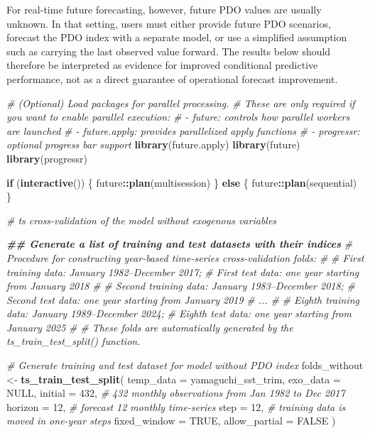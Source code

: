 \documentclass[
]{article}
\newenvironment{Shaded}{\begin{snugshade}}{\end{snugshade}}
\newcommand{\AttributeTok}[1]{\textcolor[rgb]{0.13,0.29,0.53}{#1}}
\newcommand{\CommentTok}[1]{\textcolor[rgb]{0.56,0.35,0.01}{\textit{#1}}}
\newcommand{\ConstantTok}[1]{\textcolor[rgb]{0.56,0.35,0.01}{#1}}
\newcommand{\ControlFlowTok}[1]{\textcolor[rgb]{0.13,0.29,0.53}{\textbf{#1}}}
\newcommand{\DecValTok}[1]{\textcolor[rgb]{0.00,0.00,0.81}{#1}}
\newcommand{\DocumentationTok}[1]{\textcolor[rgb]{0.56,0.35,0.01}{\textbf{\textit{#1}}}}
\newcommand{\FunctionTok}[1]{\textcolor[rgb]{0.13,0.29,0.53}{\textbf{#1}}}
\newcommand{\NormalTok}[1]{#1}
\newcommand{\OtherTok}[1]{\textcolor[rgb]{0.56,0.35,0.01}{#1}}
\newcommand{\SpecialCharTok}[1]{\textcolor[rgb]{0.81,0.36,0.00}{\textbf{#1}}}
\begin{document}
For real-time future forecasting, however, future PDO values are usually
unknown. In that setting, users must either provide future PDO
scenarios, forecast the PDO index with a separate model, or use a
simplified assumption such as carrying the last observed value forward.
The results below should therefore be interpreted as evidence for
improved conditional predictive performance, not as a direct guarantee
of operational forecast improvement.

\begin{Shaded}
\begin{Highlighting}[]
\CommentTok{\# (Optional) Load packages for parallel processing.}
\CommentTok{\# These are only required if you want to enable parallel execution:}
\CommentTok{\# {-} future: controls how parallel workers are launched}
\CommentTok{\# {-} future.apply: provides parallelized apply functions}
\CommentTok{\# {-} progressr: optional progress bar support}
\FunctionTok{library}\NormalTok{(future.apply)}
\FunctionTok{library}\NormalTok{(future)}
\FunctionTok{library}\NormalTok{(progressr)}

\ControlFlowTok{if}\NormalTok{ (}\FunctionTok{interactive}\NormalTok{()) \{}
\NormalTok{  future}\SpecialCharTok{::}\FunctionTok{plan}\NormalTok{(multisession)}
\NormalTok{\} }\ControlFlowTok{else}\NormalTok{ \{}
\NormalTok{  future}\SpecialCharTok{::}\FunctionTok{plan}\NormalTok{(sequential)}
\NormalTok{\}}


\CommentTok{\# ts cross{-}validation of the model without exogenous variables}

\DocumentationTok{\#\# Generate a list of training and test datasets with their indices}
\CommentTok{\# Procedure for constructing year{-}based time{-}series cross{-}validation folds:}
\CommentTok{\# }
\CommentTok{\# First training data: January 1982–December 2017;}
\CommentTok{\# First test data: one year starting from January 2018}
\CommentTok{\# }
\CommentTok{\# Second training data: January 1983–December 2018;}
\CommentTok{\# Second test data: one year starting from January 2019}
\CommentTok{\# ...}
\CommentTok{\# }
\CommentTok{\# Eighth training data: January 1989–December 2024;}
\CommentTok{\# Eighth test data: one year starting from January 2025}
\CommentTok{\#}
\CommentTok{\# These folds are automatically generated by the ts\_train\_test\_split() function.}

\CommentTok{\# Generate training and test dataset for model without PDO index}
\NormalTok{folds\_without }\OtherTok{\textless{}{-}} \FunctionTok{ts\_train\_test\_split}\NormalTok{(}
  \AttributeTok{temp\_data =}\NormalTok{ yamaguchi\_sst\_trim,}
  \AttributeTok{exo\_data =} \ConstantTok{NULL}\NormalTok{,}
  \AttributeTok{initial =} \DecValTok{432}\NormalTok{, }\CommentTok{\# 432 monthly observations from Jan 1982 to Dec 2017}
  \AttributeTok{horizon =} \DecValTok{12}\NormalTok{, }\CommentTok{\# forecast 12 monthly time{-}series}
  \AttributeTok{step =} \DecValTok{12}\NormalTok{, }\CommentTok{\# training data is moved in one{-}year steps}
  \AttributeTok{fixed\_window =} \ConstantTok{TRUE}\NormalTok{,}
  \AttributeTok{allow\_partial =} \ConstantTok{FALSE}
\NormalTok{  )}


\end{Highlighting}
\end{Shaded}
\end{document}
